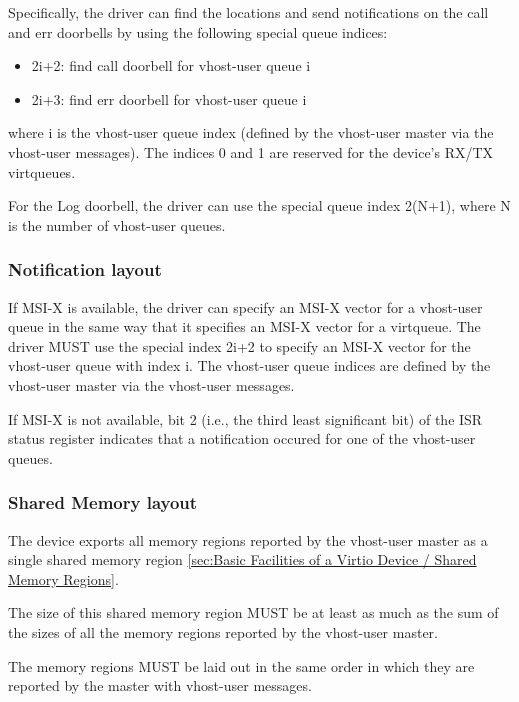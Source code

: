 Specifically, the driver can find the locations and send notifications on the
call and err doorbells by using the following special queue indices:

\begin{itemize}
\item 2i+2: find call doorbell for vhost-user queue i
\item 2i+3: find err doorbell for vhost-user queue i
\end{itemize}

where i is the vhost-user queue index (defined by the vhost-user master via the
vhost-user messages). The indices 0 and 1 are reserved for the device's RX/TX
virtqueues.

For the Log doorbell, the driver can use the special queue index 2(N+1), where N
is the number of vhost-user queues.

\subsubsection{Notification layout}\label{sec:Device Types / Vhost-user Device Backend / Additional Device Resources / Notification layout}

If MSI-X is available, the driver can specify an MSI-X vector for a vhost-user
queue in the same way that it specifies an MSI-X vector for a virtqueue. The
driver MUST use the special index 2i+2 to specify an MSI-X vector for the
vhost-user queue with index i. The vhost-user queue indices are defined by the
vhost-user master via the vhost-user messages.

If MSI-X is not available, bit 2 (i.e., the third least significant bit) of the
ISR status register indicates that a notification occured for one of the
vhost-user queues.

\subsubsection{Shared Memory layout}\label{sec:Device Types / Vhost-user Device Backend / Additional Device Resources / Shared Memory layout}

The device exports all memory regions reported by the vhost-user master as a
single shared memory region \ref{sec:Basic Facilities of a Virtio Device /
Shared Memory Regions}.

The size of this shared memory region MUST be at least as much as the sum of the
sizes of all the memory regions reported by the vhost-user master.

The memory regions MUST be laid out in the same order in which they are reported
by the master with vhost-user messages.

